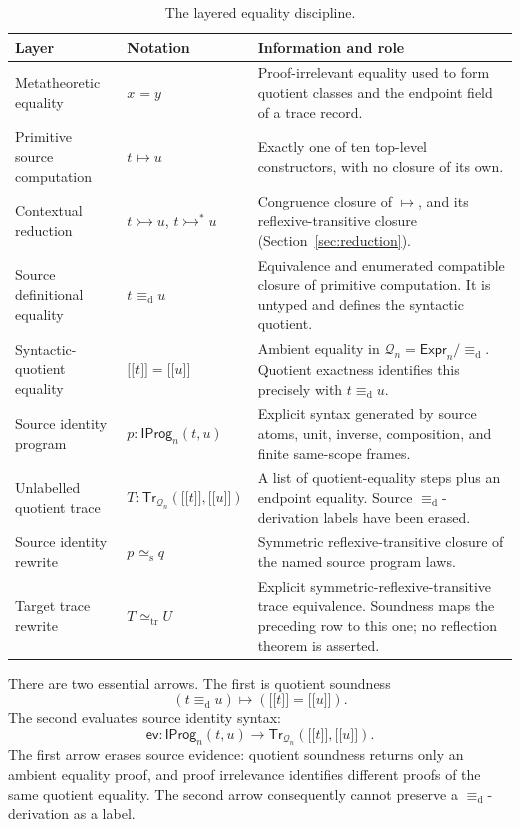 \documentclass[10pt,reqno]{amsart}
\newcommand{\Expr}{\mathsf{Expr}}
\newcommand{\Tr}{\mathsf{Tr}}
\newcommand{\TrEq}{\mathrel{\simeq_{\mathrm{tr}}}}
\newcommand{\IProg}{\mathsf{IProg}}
\newcommand{\ev}{\mathsf{ev}}
\newcommand{\den}[1]{\mathopen{\lbrack\!\lbrack}#1\mathclose{\rbrack\!\rbrack}}
\newcommand{\defeq}{\mathrel{\equiv_{\mathrm d}}}
\newcommand{\red}{\mathrel{\longmapsto}}
\newcommand{\ctxred}{\mathrel{\rightarrowtail}}
\newcommand{\ctxredstar}{\mathrel{\rightarrowtail^{*}}}
\newcommand{\srweq}{\mathrel{\simeq_{\mathrm s}}}
\newcommand{\Q}{\mathcal{Q}}
\begin{document}
\begin{table}[ht]
\centering
\small
\renewcommand{\arraystretch}{1.22}
\begin{tabular}{>{\raggedright\arraybackslash}p{}
                >{\centering\arraybackslash}p{}
                >{\raggedright\arraybackslash}p{}}
\toprule
Layer & Notation & Information and role\\
\midrule
Metatheoretic equality
  & \(x=y\)
  & Proof-irrelevant equality used to form quotient classes and the endpoint
    field of a trace record.\\
Primitive source computation
  & \(t\red u\)
  & Exactly one of ten top-level constructors, with no closure of its own.\\
Contextual reduction
  & \(t\ctxred u\), \(t\ctxredstar{}u\)
  & Congruence closure of \(\red\), and its reflexive-transitive closure
    (Section~\ref{sec:reduction}).\\
Source definitional equality
  & \(t\defeq u\)
  & Equivalence and enumerated compatible closure of primitive computation.
    It is untyped and defines the syntactic quotient.\\
Syntactic-quotient equality
  & \(\den t=\den u\)
  & Ambient equality in \(\Q_n=\Expr_n/{\defeq}\).  Quotient exactness
    identifies this precisely with \(t\defeq u\).\\
Source identity program
  & \(p:\IProg_n(t,u)\)
  & Explicit syntax generated by source atoms, unit, inverse, composition,
    and finite same-scope frames.\\
Unlabelled quotient trace
  & \(T:\Tr_{\Q_n}(\den t,\den u)\)
  & A list of quotient-equality steps plus an endpoint equality.  Source
    \(\defeq\)-derivation labels have been erased.\\
Source identity rewrite
  & \(p\srweq q\)
  & Symmetric reflexive-transitive closure of the named source program laws.\\
Target trace rewrite
  & \(T\TrEq U\)
  & Explicit symmetric-reflexive-transitive trace equivalence.  Soundness maps the
    preceding row to this one; no reflection theorem is asserted.\\
\bottomrule
\end{tabular}
\caption{The layered equality discipline.}
\label{tab:equality-layers}
\end{table}

There are two essential arrows.  The first is quotient soundness
\[
       (t\defeq u)\longmapsto(\den t=\den u).
\]
The second evaluates source identity syntax:
\[
       \ev:\IProg_n(t,u)\longrightarrow
       \Tr_{\Q_n}(\den t,\den u).
\]
The first arrow erases source evidence: quotient soundness returns only an
ambient equality proof, and proof irrelevance identifies different proofs of
the same quotient equality.  The second arrow consequently cannot preserve a
\(\defeq\)-derivation as a label.
\end{document}
